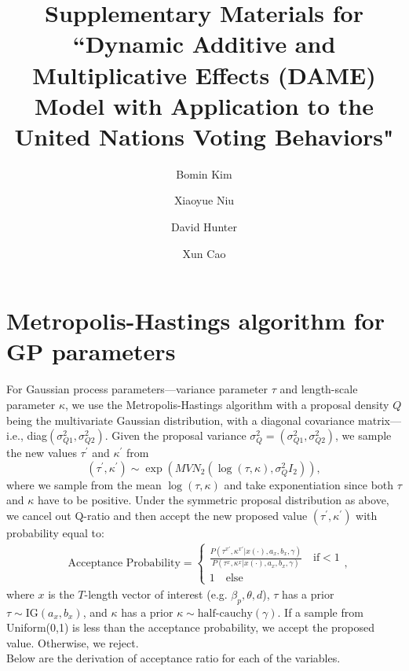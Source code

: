 \documentclass[a4paper]{article}
\title{Supplementary Materials for \\``Dynamic Additive and Multiplicative Effects (DAME) Model with Application to the United Nations Voting Behaviors"}
\author[1]{Bomin Kim}
\author[1]{Xiaoyue Niu}
\author[1]{David Hunter}
\author[2]{Xun Cao}
\affil[1]{Department of Statistics, The Pennsylvania State University}
\affil[2]{Department of Political Science, The Pennsylvania State University}
\date{}
\begin{document}
	\maketitle
\section{Metropolis-Hastings algorithm for GP parameters}
For Gaussian process parameters---variance parameter $\tau$ and length-scale parameter $\kappa$, we use the Metropolis-Hastings algorithm with a proposal density $Q$ being the multivariate Gaussian distribution, with a diagonal covariance matrix---i.e., diag$ (\sigma^2_{Q1}, \sigma^2_{Q2})$. Given the proposal variance $\sigma^2_Q = (\sigma^2_{Q1}, \sigma^2_{Q2})$, we sample the new values $\tau^\prime$ and $\kappa^\prime$ from
\begin{equation*}
	(\tau^\prime, \kappa^\prime) \sim \exp(MVN_2(\log(\tau, \kappa), \sigma^2_QI_2)),
\end{equation*}
where we sample from the mean $\log(\tau, \kappa)$ and take exponentiation since both $\tau$ and $\kappa$ have to be positive. 
Under the symmetric proposal distribution as above, we cancel out Q-ratio and then accept the new proposed value $(\tau^\prime, \kappa^\prime)$ with probability equal to:
\begin{equation}
\begin{split}
& \mbox{Acceptance Probability}=
\begin{cases}  \frac{P(\tau^{x\prime}, \kappa^{x\prime}|x(\cdot), a_x, b_x,\gamma)}{P(\tau^{x}, \kappa^{x}|x(\cdot), a_x, b_x,\gamma)}\quad\text{if}  <1\\
1 \quad \text{else}
\end{cases},
\end{split}
\end{equation}
where $x$ is the $T$-length vector of interest (e.g. $\beta_p, \theta, d$), $\tau$ has a prior $\tau \sim \mbox{IG}(a_x, b_x)$, and $\kappa$ has a prior $\kappa \sim \mbox{half-cauchy}(\gamma)$. If a sample from Uniform(0,1) is less than the acceptance probability, we accept the proposed value. Otherwise, we reject.\\ \newline
Below are the derivation of acceptance ratio for each of the variables.
\end{document}
